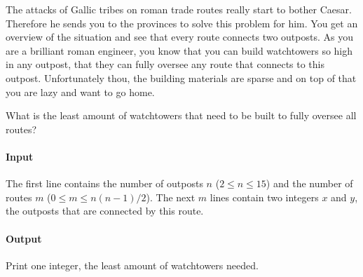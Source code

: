 




The attacks of Gallic tribes on roman trade routes really start to bother Caesar. Therefore he sends you to the provinces to solve this problem for him. You get an overview of the situation and see that every route connects two outposts. As you are a brilliant roman engineer, you know that you can build watchtowers so high in any outpost, that they can fully oversee any route that connects to this outpost. Unfortunately thou, the building materials are sparse and on top of that you are lazy and want to go home.

What is the least amount of watchtowers that need to be built to fully oversee all routes?

\paragraph*{Input}

The first line contains the number of outposts $n$ ($ 2 \leq n \leq 15$) and the number of routes $m$ ($ 0 \leq m \leq n(n-1)/2$). The next $m$ lines contain two integers $x$ and $y$, the outposts that are connected by this route.

\paragraph*{Output}

Print one integer, the least amount of watchtowers needed.

\begin{samples}
\end{samples}


